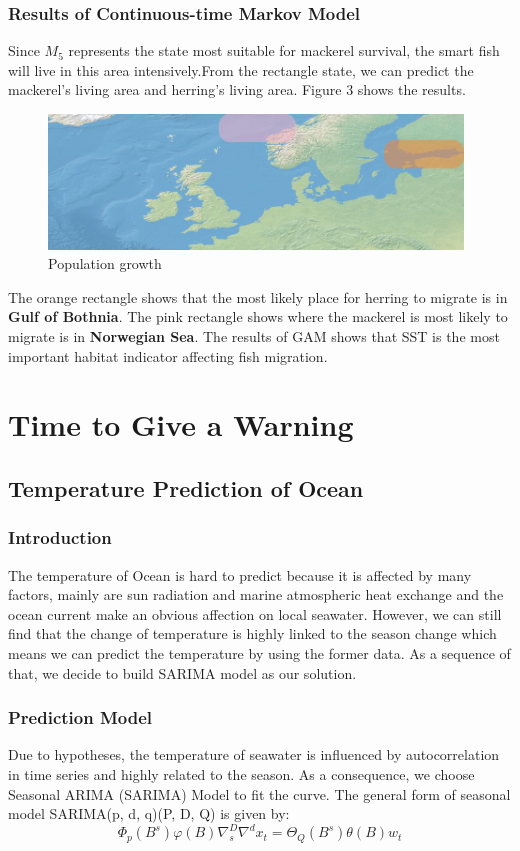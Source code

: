 \documentclass{mcmthesis}
\begin{document}
\subsubsection{Results of Continuous-time Markov Model}
Since $M_5$ represents the state most suitable for mackerel survival, the smart fish will live in this area intensively.From the rectangle state, we can predict the mackerel's living area and herring's living area. Figure 3 shows the results.
\begin{figure}[htbp]
\small\centering
\includegraphics[width=11cm]{./figures/G2.png}
\caption{Population growth}
\end{figure}

The orange rectangle shows that the most likely place for herring to migrate is in \textbf{ Gulf of Bothnia}.
The pink rectangle shows where the mackerel is most likely to migrate is in \textbf{Norwegian Sea}.
The results of GAM shows that SST is the most important habitat indicator affecting fish migration.


\section{Time to Give a Warning}
\subsection{Temperature Prediction of Ocean}
\subsubsection{Introduction}
The temperature of Ocean is hard to predict because it is affected by many factors, mainly are sun radiation and marine atmospheric heat exchange and the ocean current make an obvious affection on local seawater. However, we can still find that the change of temperature is highly linked to the season change which means we can predict the temperature by using the former data. As a sequence of that, we decide to build SARIMA model as our solution.


\subsubsection{Prediction Model}
Due to hypotheses, the temperature of seawater is influenced by autocorrelation in time series and highly related to the season. As a consequence, we choose Seasonal ARIMA (SARIMA) Model \cite{1} to fit the curve. The general form of seasonal model SARIMA(p, d, q)(P, D, Q) is given by:
\begin{equation}
\Phi_{p}(B^s)\varphi(B)\nabla_{s}^{D}\nabla^{d} x_{t} = 
\Theta_{Q}(B^s)\theta(B)w_{t}
\end{equation} 
\end{document}
